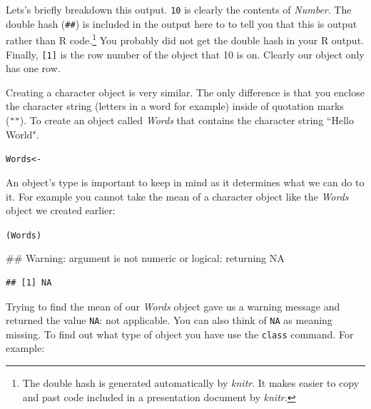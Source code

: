 \noindent Lets's briefly breakdown this output. \texttt{10} is clearly the contents of {\emph{Number}}. The double hash (\texttt{\#\#}) is included in the output here to to tell you that this is output rather than R code.\footnote{The double hash is generated automatically by {\emph{knitr}}. It makes easier to copy and past code included in a presentation document by {\emph{knitr}}.} You probably did not get the double hash in your R output. Finally, \texttt{[1]} is the row number of the object that 10 is on. Clearly our object only has one row.   

Creating a character object is very similar. The only difference is that you enclose the character string (letters in a word for example) inside of quotation marks ({\tt{""}}). To create an object called {\emph{Words}} that contains the character string ``Hello World".\label{StringObject}

\begin{knitrout}
\color{fgcolor}\begin{kframe}
\begin{alltt}
Words <- 
\end{alltt}
\end{kframe}
\end{knitrout}



An object's type is important to keep in mind as it determines what we can do to it. For example you cannot take the mean of a character object like the {\emph{Words}} object we created earlier:

\begin{knitrout}
\color{fgcolor}\begin{kframe}
\begin{alltt}
(Words)
\end{alltt}


{\ttfamily\noindent\textcolor{warningcolor}{\#\# Warning: argument is not numeric or logical: returning NA}}\begin{verbatim}
## [1] NA
\end{verbatim}
\end{kframe}
\end{knitrout}


\noindent Trying to find the mean of our {\emph{Words}} object gave us a warning message and returned the value {\tt{NA}}: not applicable. You can also think of {\tt{NA}} as meaning missing. To find out what type of object you have use the {\tt{class}} command. For example:

